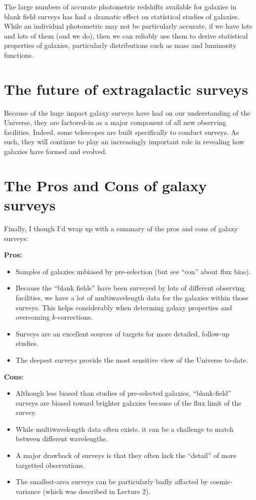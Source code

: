 \documentclass[11pt]{article}
\begin{document}
The large numbers of accurate photometric redshifts available for
galaxies in blank field surveys has had a dramatic effect on
statistical studies of galaxies. While an individual photometric may
not be particularly accurate, if we have lots and lots of them (and we
do), then we can reliably use them to derive statistical properties of
galaxies, particularly distributions such as mass and luminosity functions.

\section{The future of extragalactic surveys}
Because of the huge impact galaxy surveys have had on our
understanding of the Universe, they are factored-in as a major
component of all new observing facilities. Indeed, some telescopes are
built specifically to conduct surveys. As such, they will continue to
play an increasingly important role in revealing how galaxies have
formed and evolved. 

\section{The Pros and Cons of galaxy surveys}
Finally, I though I'd wrap up with a summary of the pros and cons of
galaxy surveys:

{\bf Pros:}
\begin{itemize}
\item Samples of galaxies unbiased by pre-selection (but see ``con''
  about flux bias).
\item Because the ``blank fields'' have been surveyed by lots of
  different observing facilities, we have a lot of multiwavelength
  data for the galaxies within those surveys. This helps considerably
  when determing galaxy properties and overcoming $k$-corrections.
\item Surveys are an excellent sources of targets for more detailed,
  follow-up studies.
\item The deepest surveys provide the most sensitive view of the
  Universe to-date.
\end{itemize}

{\bf Cons:}
\begin{itemize}
\item Although less biased than studies of pre-selected galaxies,
  ``blank-field'' surveys are biased toward brighter galaxies because
  of the flux limit of the survey.
\item While multiwavelength data often exists, it can be a challenge
  to match between different wavelengths.
\item A major drawback of surveys is that they often lack the
  ``detail'' of more targetted observations.
\item The smallest-area surveys can be particularly badly affacted by
  cosmic-variance (which was described in Lecture 2).
\end{itemize}
\end{document}

